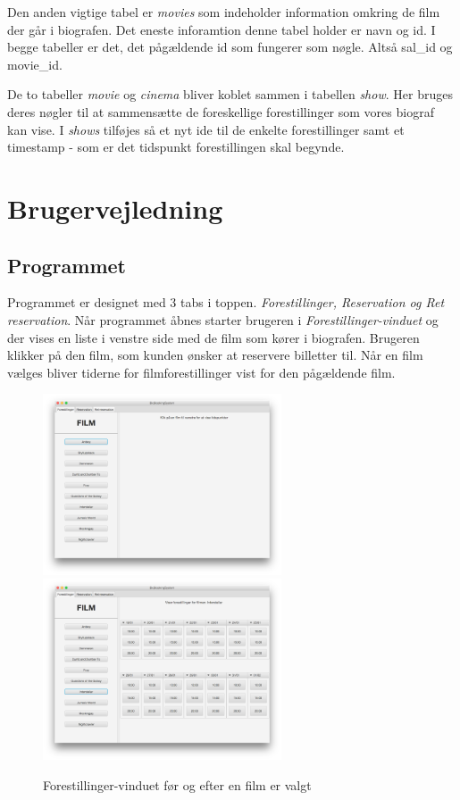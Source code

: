 \documentclass[final]{report}
\begin{document}
Den anden vigtige tabel er \emph{movies} som indeholder information omkring de film der går i biografen. Det eneste inforamtion denne tabel holder er navn og id. I begge tabeller er det, det pågældende id som fungerer som nøgle. Altså sal\_id og movie\_id.  

De to tabeller \emph{movie} og \emph{cinema} bliver koblet sammen i tabellen \emph{show}. Her bruges deres nøgler til at sammensætte de foreskellige forestillinger som vores biograf kan vise. I \emph{shows} tilføjes så et nyt ide til de enkelte forestillinger samt et timestamp - som er det tidspunkt forestillingen skal begynde.


\chapter{Brugervejledning}
\section{Programmet}
Programmet er designet med 3 tabs i toppen. \emph{Forestillinger, Reservation og Ret reservation}. Når programmet åbnes starter brugeren i \emph{Forestillinger-vinduet} og der vises en liste i venstre side med de film som kører i biografen. Brugeren klikker på den film, som kunden ønsker at reservere billetter til. Når en film vælges bliver tiderne for filmforestillinger vist for den pågældende film. \\


\begin{figure}[h]
\centering
\includegraphics[width=200pt]{1.png}
\includegraphics[width=200pt]{2.png}
\caption{Forestillinger-vinduet før og efter en film er valgt}
\end{figure}
\end{document}
